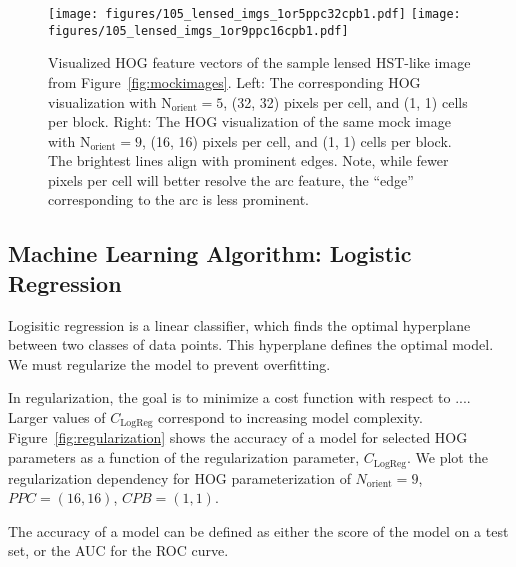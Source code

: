 \documentclass{emulateapj}
\begin{document}
\begin{figure*}[t]\label{fig:hogvisual}
\begin{center}
\texttt{[image: figures/105\_lensed\_imgs\_1or5ppc32cpb1.pdf]}\hspace{-20pt}
\texttt{[image: figures/105\_lensed\_imgs\_1or9ppc16cpb1.pdf]}\hspace{-20pt}
\caption{Visualized HOG feature vectors of the sample lensed HST-like
  image from Figure~\ref{fig:mockimages}.  Left: The corresponding HOG
  visualization with N$_\text{orient}=5$, (32, 32) pixels per cell,
  and (1, 1) cells per block.  Right: The HOG visualization of the
  same mock image with N$_\text{orient}=9$, (16, 16) pixels per cell,
  and (1, 1) cells per block.  The brightest lines align with
  prominent edges.  Note, while fewer pixels per cell will better
  resolve the arc feature, the ``edge'' corresponding to the arc is
  less prominent.  }
\end{center}
\end{figure*}


\subsection{Machine Learning Algorithm: Logistic Regression}\label{sec:logreg}

Logisitic regression is a linear classifier, which finds the optimal
hyperplane between two classes of data points.  This hyperplane
defines the optimal model.  We must regularize the model to prevent
overfitting.  

In regularization, the goal is to minimize a cost function with
respect to ....  Larger values of $C_\text{LogReg}$ correspond to
increasing model complexity.  Figure~\ref{fig:regularization} shows
the accuracy of a model for selected HOG parameters as a function of
the regularization parameter, $C_\text{LogReg}$.  We plot the
regularization dependency for HOG parameterization of
$N_\text{orient}=9$, $PPC=(16, 16)$, $CPB=(1,1)$.  

The accuracy of a model can be defined as either the score of the
model on a test set, or the AUC for the ROC curve.


\end{document}
